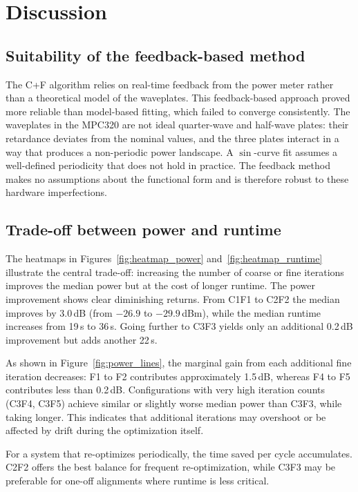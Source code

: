 \section{Discussion}

\subsection{Suitability of the feedback-based method}

The C+F algorithm relies on real-time feedback from the power meter rather than a theoretical model of the waveplates. This feedback-based approach proved more reliable than model-based fitting, which failed to converge consistently. The waveplates in the MPC320 are not ideal quarter-wave and half-wave plates: their retardance deviates from the nominal values, and the three plates interact in a way that produces a non-periodic power landscape. A $\sin$-curve fit assumes a well-defined periodicity that does not hold in practice. The feedback method makes no assumptions about the functional form and is therefore robust to these hardware imperfections.

\subsection{Trade-off between power and runtime}

The heatmaps in Figures~\ref{fig:heatmap_power} and~\ref{fig:heatmap_runtime} illustrate the central trade-off: increasing the number of coarse or fine iterations improves the median power but at the cost of longer runtime. The power improvement shows clear diminishing returns. From C1F1 to C2F2 the median improves by 3.0\,dB (from $-26.9$ to $-29.9$\,dBm), while the median runtime increases from 19\,s to 36\,s. Going further to C3F3 yields only an additional 0.2\,dB improvement but adds another 22\,s.

As shown in Figure~\ref{fig:power_lines}, the marginal gain from each additional fine iteration decreases: F1 to F2 contributes approximately 1.5\,dB, whereas F4 to F5 contributes less than 0.2\,dB. Configurations with very high iteration counts (C3F4, C3F5) achieve similar or slightly worse median power than C3F3, while taking longer. This indicates that additional iterations may overshoot or be affected by drift during the optimization itself.

For a system that re-optimizes periodically, the time saved per cycle accumulates. C2F2 offers the best balance for frequent re-optimization, while C3F3 may be preferable for one-off alignments where runtime is less critical.

